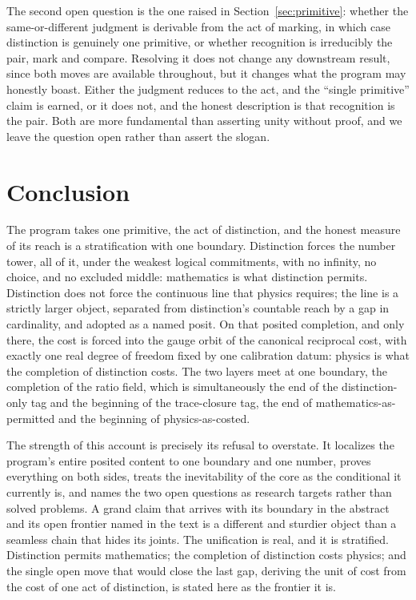 \documentclass[11pt,a4paper]{article}
\theoremstyle{definition}
\theoremstyle{remark}
\begin{document}
The second open question is the one raised in Section~\ref{sec:primitive}: whether
the same-or-different judgment is derivable from the act of marking, in which case
distinction is genuinely one primitive, or whether recognition is irreducibly the
pair, mark and compare. Resolving it does not change any downstream result, since
both moves are available throughout, but it changes what the program may honestly
boast. Either the judgment reduces to the act, and the ``single primitive'' claim
is earned, or it does not, and the honest description is that recognition is the
pair. Both are more fundamental than asserting unity without proof, and we leave
the question open rather than assert the slogan.

\section{Conclusion}

The program takes one primitive, the act of distinction, and the honest measure of
its reach is a stratification with one boundary. Distinction forces the number
tower, all of it, under the weakest logical commitments, with no infinity, no
choice, and no excluded middle: mathematics is what distinction permits.
Distinction does not force the continuous line that physics requires; the line is a
strictly larger object, separated from distinction's countable reach by a gap in
cardinality, and adopted as a named posit. On that posited completion, and only
there, the cost is forced into the gauge orbit of the canonical reciprocal cost,
with exactly one real degree of freedom fixed by one calibration datum: physics is
what the completion of distinction costs. The two layers meet at one boundary, the
completion of the ratio field, which is simultaneously the end of the
distinction-only tag and the beginning of the trace-closure tag, the end of
mathematics-as-permitted and the beginning of physics-as-costed.

The strength of this account is precisely its refusal to overstate. It localizes
the program's entire posited content to one boundary and one number, proves
everything on both sides, treats the inevitability of the core as the conditional
it currently is, and names the two open questions as research targets rather than
solved problems. A grand claim that arrives with its boundary in the abstract and
its open frontier named in the text is a different and sturdier object than a
seamless chain that hides its joints. The unification is real, and it is
stratified. Distinction permits mathematics; the completion of distinction costs
physics; and the single open move that would close the last gap, deriving the unit
of cost from the cost of one act of distinction, is stated here as the frontier it
is.
\end{document}
